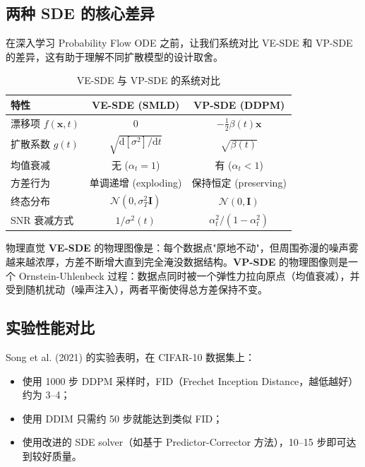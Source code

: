 \documentclass[a4paper]{article}
\begin{document}
\subsection{两种 SDE 的核心差异}

在深入学习 Probability Flow ODE 之前，让我们系统对比 VE-SDE 和 VP-SDE 的差异，这有助于理解不同扩散模型的设计取舍。

\begin{table}[H]
\centering
\begin{tabular}{lcc}
\toprule
\textbf{特性} & \textbf{VE-SDE (SMLD)} & \textbf{VP-SDE (DDPM)} \\
\midrule
漂移项 $f(\mathbf{x},t)$ & $0$ & $-\frac{1}{2}\beta(t)\mathbf{x}$ \\
扩散系数 $g(t)$ & $\sqrt{\mathrm{d}[\sigma^2]/\mathrm{d}t}$ & $\sqrt{\beta(t)}$ \\
均值衰减 & 无 ($\alpha_t = 1$) & 有 ($\alpha_t < 1$) \\
方差行为 & 单调递增 (exploding) & 保持恒定 (preserving) \\
终态分布 & $\mathcal{N}(0, \sigma_T^2 \mathbf{I})$ & $\mathcal{N}(0, \mathbf{I})$ \\
SNR 衰减方式 & $1/\sigma^2(t)$ & $\alpha_t^2/(1-\alpha_t^2)$ \\
\bottomrule
\end{tabular}
\caption{VE-SDE 与 VP-SDE 的系统对比}
\end{table}

\begin{knowledgebox}{物理直觉}
\textbf{VE-SDE} 的物理图像是：每个数据点"原地不动"，但周围弥漫的噪声雾越来越浓厚，方差不断增大直到完全淹没数据结构。\textbf{VP-SDE} 的物理图像则是一个 Ornstein-Uhlenbeck 过程：数据点同时被一个弹性力拉向原点（均值衰减），并受到随机扰动（噪声注入），两者平衡使得总方差保持不变。
\end{knowledgebox}

\subsection{实验性能对比}

Song et al. (2021) 的实验表明，在 CIFAR-10 数据集上：
\begin{itemize}
    \item 使用 1000 步 DDPM 采样时，FID（Frechet Inception Distance，越低越好）约为 3--4；
    \item 使用 DDIM 只需约 50 步就能达到类似 FID；
    \item 使用改进的 SDE solver（如基于 Predictor-Corrector 方法），10--15 步即可达到较好质量。
\end{itemize}
\end{document}

